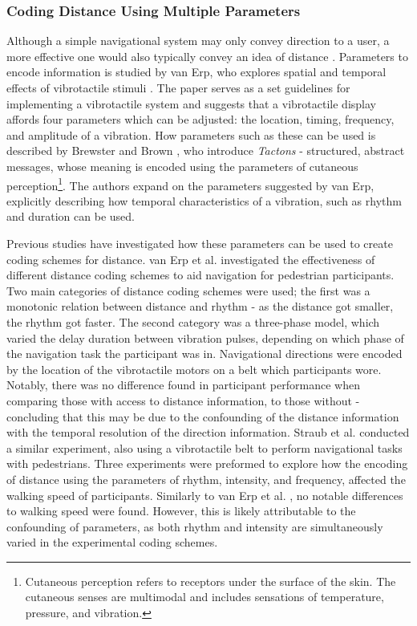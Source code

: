 \documentclass{interim}
\begin{document}
\subsubsection{Coding Distance Using Multiple Parameters}\label{sec:coding-distance}
Although a simple navigational system may only convey direction to a user, a more effective one would also typically convey an idea of distance \cite{burntt2002empirical}. Parameters to encode information is studied by van Erp, who explores spatial and temporal effects of vibrotactile stimuli \cite{guidelines}. The paper serves as a set guidelines for implementing a vibrotactile system and suggests that a vibrotactile display affords four parameters which can be adjusted: the location, timing, frequency, and amplitude of a vibration. How parameters such as these can be used is described by Brewster and Brown \cite{10.5555/976310.976313}, who introduce \textit{Tactons} - structured, abstract messages, whose meaning is encoded using the parameters of cutaneous perception\footnote{Cutaneous perception refers to receptors under the surface of the skin. The cutaneous senses are multimodal and includes sensations of temperature, pressure, and vibration.}. The authors expand on the parameters suggested by van Erp, explicitly describing how temporal characteristics of a vibration, such as rhythm and duration can be used.

Previous studies have investigated how these parameters can be used to create coding schemes for distance. van Erp et al. \cite{10.1145/1060581.1060585} investigated the effectiveness of different distance coding schemes to aid navigation for pedestrian participants. Two main categories of distance coding schemes were used; the first was a monotonic relation between distance and rhythm - as the distance got smaller, the rhythm got faster. The second category was a three-phase model, which varied the delay duration between vibration pulses, depending on which phase of the navigation task the participant was in. Navigational directions were encoded by the location of the vibrotactile motors on a belt which participants wore. Notably, there was no difference found in participant performance when comparing those with access to distance information, to those without - concluding that this may be due to the confounding of the distance information with the temporal resolution of the direction information. Straub et al. \cite{5326374} conducted a similar experiment, also using a vibrotactile belt to perform navigational tasks with pedestrians. Three experiments were preformed to explore how the encoding of distance using the parameters of rhythm, intensity, and frequency, affected the walking speed of participants. Similarly to van Erp et al. \cite{10.1145/1060581.1060585}, no notable differences to walking speed were found. However, this is likely attributable to the confounding of parameters, as both rhythm and intensity are simultaneously varied in the experimental coding schemes.
\end{document}
